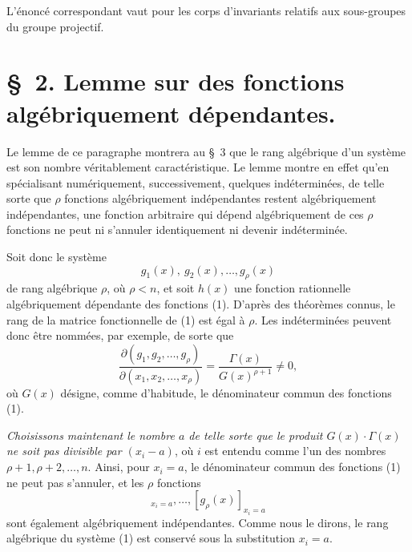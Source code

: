 \documentclass[11pt]{article}
\begin{document}
L'énoncé correspondant vaut pour les corps d'invariants relatifs aux sous-groupes du groupe projectif.

\section*{\S\ 2. Lemme sur des fonctions algébriquement dépendantes.}

Le lemme de ce paragraphe montrera au \S\ 3 que le rang algébrique d'un système est son nombre véritablement caractéristique. Le lemme montre en effet qu'en spécialisant numériquement, successivement, quelques indéterminées, de telle sorte que $\rho$ fonctions algébriquement indépendantes restent algébriquement indépendantes, une fonction arbitraire qui dépend algébriquement de ces $\rho$ fonctions ne peut ni s'annuler identiquement ni devenir indéterminée.

Soit donc le système
\begin{equation}
  g_1(x),\ g_2(x),\ldots,g_\rho(x)
\tag{1}
\end{equation}
de rang algébrique $\rho$, où $\rho<n$, et soit $h(x)$ une fonction rationnelle algébriquement dépendante des fonctions (1). D'après des théorèmes connus, le rang de la matrice fonctionnelle de (1) est égal à $\rho$. Les indéterminées peuvent donc être nommées, par exemple, de sorte que
\begin{equation}
 \frac{\partial(g_1,g_2,\ldots,g_\rho)}{\partial(x_1,x_2,\ldots,x_\rho)}
 =\frac{\Gamma(x)}{G(x)^{\rho+1}}\ne0,
\tag{2}
\end{equation}
où $G(x)$ désigne, comme d'habitude, le dénominateur commun des fonctions (1).

\emph{Choisissons maintenant le nombre $a$ de telle sorte que le produit $G(x)\cdot\Gamma(x)$ ne soit pas divisible par $(x_i-a)$}, où $i$ est entendu comme l'un des nombres $\rho+1,\rho+2,\ldots,n$. Ainsi, pour $x_i=a$, le dénominateur commun des fonctions (1) ne peut pas s'annuler, et les $\rho$ fonctions
\begin{equation}
  [g_1(x)]_{x_i=a},\ldots,[g_\rho(x)]_{x_i=a}
\tag{3}
\end{equation}
sont également algébriquement indépendantes. Comme nous le dirons, le rang algébrique du système (1) est conservé sous la substitution $x_i=a$.
\end{document}
